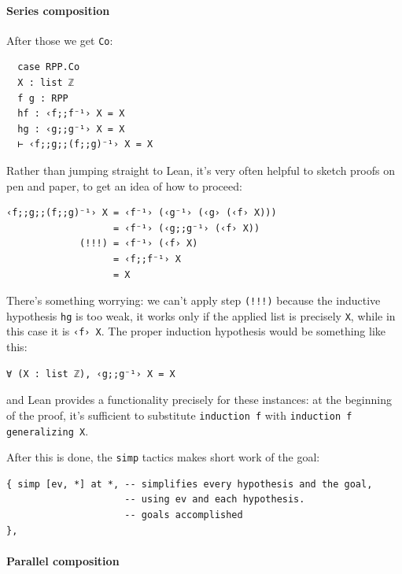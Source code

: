 \documentclass{book}
\theoremstyle{definition}
\theoremstyle{remark}
\theoremstyle{plain}
\begin{document}
\paragraph{Series composition}

After those we get \lstinline{Co}:
\begin{lstlisting}
  case RPP.Co
  X : list ℤ
  f g : RPP
  hf : ‹f;;f⁻¹› X = X
  hg : ‹g;;g⁻¹› X = X
  ⊢ ‹f;;g;;(f;;g)⁻¹› X = X
\end{lstlisting}
Rather than jumping straight to Lean,
it's very often helpful to sketch proofs on pen and paper, to get an idea of how to proceed:
\begin{lstlisting}
‹f;;g;;(f;;g)⁻¹› X = ‹f⁻¹› (‹g⁻¹› (‹g› (‹f› X)))
                   = ‹f⁻¹› (‹g;;g⁻¹› (‹f› X))
             (!!!) = ‹f⁻¹› (‹f› X)
                   = ‹f;;f⁻¹› X
                   = X
\end{lstlisting}
There's something worrying:
we can't apply step \lstinline{(!!!)} because the inductive hypothesis \lstinline{hg} is too weak,
it works only if the applied list is precisely \lstinline{X}, while in this case it is \lstinline{‹f› X}.
The proper induction hypothesis would be something like this:
\begin{lstlisting}
∀ (X : list ℤ), ‹g;;g⁻¹› X = X
\end{lstlisting}
and Lean provides a functionality precisely for these instances:
at the beginning of the proof, it's sufficient to substitute \lstinline{induction f} with \lstinline{induction f generalizing X}.

After this is done, the \lstinline{simp} tactics makes short work of the goal:
\begin{lstlisting}
{ simp [ev, *] at *, -- simplifies every hypothesis and the goal,
                     -- using ev and each hypothesis.
                     -- goals accomplished
},
\end{lstlisting}

\paragraph{Parallel composition}
\end{document}
